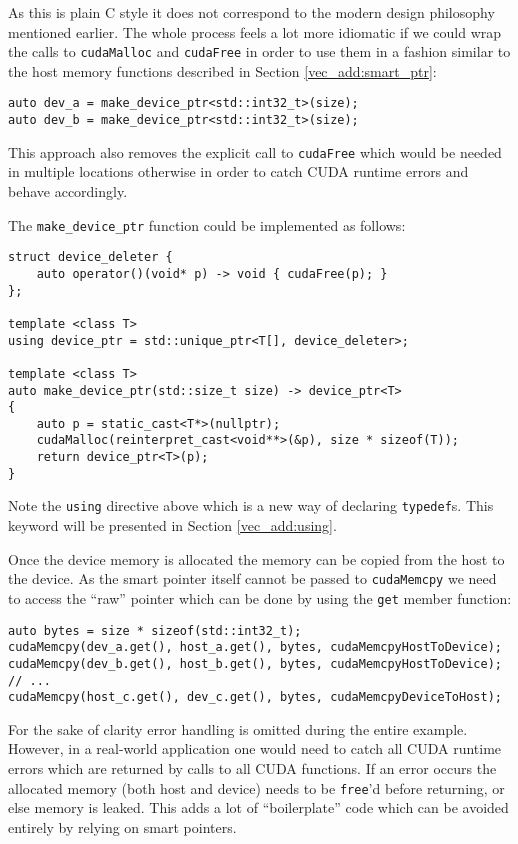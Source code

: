 As this is plain C style it does not correspond to the modern design philosophy mentioned earlier. The whole process feels a lot more idiomatic if we could wrap the calls to \texttt{cudaMalloc} and \texttt{cudaFree} in order to use them in a fashion similar to the host memory functions described in Section \ref{vec_add:smart_ptr}:

\begin{lstlisting}
auto dev_a = make_device_ptr<std::int32_t>(size);
auto dev_b = make_device_ptr<std::int32_t>(size);
\end{lstlisting}

This approach also removes the explicit call to \texttt{cudaFree} which would be needed in multiple locations otherwise in order to catch CUDA runtime errors and behave accordingly.

The \texttt{make\_device\_ptr} function could be implemented as follows:

\begin{lstlisting}
struct device_deleter { 
    auto operator()(void* p) -> void { cudaFree(p); }
};

template <class T>
using device_ptr = std::unique_ptr<T[], device_deleter>;

template <class T>
auto make_device_ptr(std::size_t size) -> device_ptr<T>
{
    auto p = static_cast<T*>(nullptr);
    cudaMalloc(reinterpret_cast<void**>(&p), size * sizeof(T));
    return device_ptr<T>(p);
}
\end{lstlisting}

Note the \texttt{using} directive above which is a new way of declaring \texttt{typedef}s. This keyword will be presented in Section \ref{vec_add:using}.

Once the device memory is allocated the memory can be copied from the host to the device. As the smart pointer itself cannot be passed to \texttt{cudaMemcpy} we need to access the ``raw'' pointer which can be done by using the \texttt{get} member function:

\begin{lstlisting}
auto bytes = size * sizeof(std::int32_t);
cudaMemcpy(dev_a.get(), host_a.get(), bytes, cudaMemcpyHostToDevice);
cudaMemcpy(dev_b.get(), host_b.get(), bytes, cudaMemcpyHostToDevice);
// ...
cudaMemcpy(host_c.get(), dev_c.get(), bytes, cudaMemcpyDeviceToHost);
\end{lstlisting}

For the sake of clarity error handling is omitted during the entire example. However, in a real-world application one would need to catch all CUDA runtime errors which are returned by calls to all CUDA functions. If an error occurs the allocated memory (both host and device) needs to be \texttt{free}'d before returning, or else memory is leaked. This adds a lot of ``boilerplate'' code which can be avoided entirely by relying on smart pointers.

